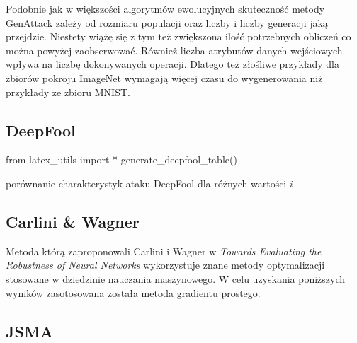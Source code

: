 \documentclass[
    left=2.5cm,         %
    right=2.5cm,        %
    top=2.5cm,          %
    bottom=3cm,         %
    bindingoffset=6mm,  %
    nohyphenation=false %
]{eiti/eiti-thesis}
\begin{document}
Podobnie jak w większości algorytmów ewolucyjnych skuteczność metody GenAttack zależy od rozmiaru populacji oraz liczby
i liczby generacji jaką przejdzie. Niestety wiążę się z tym też zwiększona ilość potrzebnych obliczeń co można powyżej zaobserwować.
Również liczba atrybutów danych wejściowych wpływa na liczbę dokonywanych operacji. Dlatego też złośliwe przykłady dla zbiorów pokroju
ImageNet wymagają więcej czasu do wygenerowania niż przykłady ze zbioru MNIST.

\subsection{DeepFool}

\begin{table}[h]
\begin{adjustbox}{max width=\textwidth}
\begin{pycode}
from latex_utils import *
generate_deepfool_table()
\end{pycode}
\end{adjustbox}
\caption{porównanie charakterystyk ataku DeepFool dla różnych wartości \(i\)}
\end{table}

\subsection{Carlini \& Wagner}
Metoda którą zaproponowali Carlini i Wagner w \textit{Towards Evaluating the Robustness of Neural Networks}\cite{DBLP:journals/corr/CarliniW16a}
wykorzystuje znane metody optymalizacji stosowane w dziedzinie nauczania maszynowego. W celu uzyskania poniższych wyników zasotosowana została
metoda gradientu prostego.
\subsection{JSMA}




\cleardoublepage




\newpage
\pagestyle{plain}

\vspace{0.8cm}
\acronymlist
{}

\listoffigurestoc     %
\vspace{1cm}          %
\listoftablestoc      %
\vspace{1cm}          %
\listofappendicestoc  %

\end{document}
